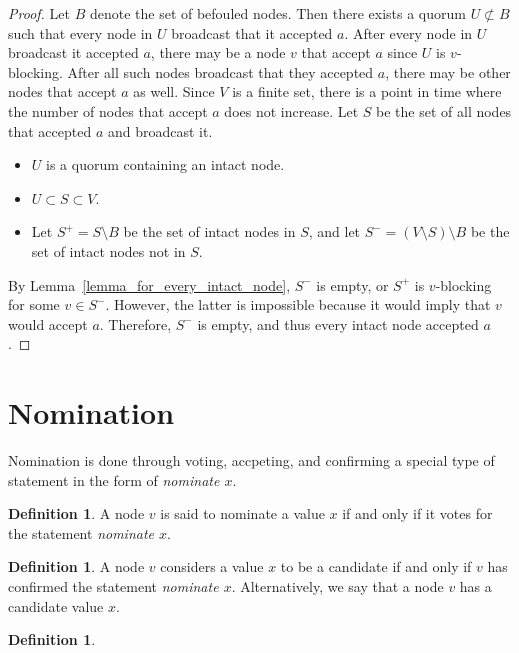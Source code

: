 \documentclass[12pt, psamsfonts]{amsart}
\theoremstyle{definition}
\newtheorem{defn}[thm]{Definition}
\theoremstyle{remark}
\numberwithin{equation}{section}
\begin{document}
\begin{proof}
    Let $B$ denote the set of befouled nodes.
    Then there exists a quorum $U \not\subset B$ such that every node in $U$ broadcast that it accepted $a$.
    After every node in $U$ broadcast it accepted $a$, there may be a node $v$ that accept $a$ since $U$ is $v$-blocking.
    After all such nodes broadcast that they accepted $a$, there may be other nodes that accept $a$ as well.
    Since $V$ is a finite set, there is a point in time where the number of nodes that accept $a$ does not increase.
    Let $S$ be the set of all nodes that accepted $a$ and broadcast it.
    \begin{itemize}
        \item
            $U$ is a quorum containing an intact node.
        \item
            $U \subset S \subset V$.
        \item
            Let $S^{+} = S \setminus B$ be the set of intact nodes in $S$, and let $S^{-} = (V \setminus S) \setminus B$ be the set of intact nodes not in $S$.
    \end{itemize}
    By Lemma~\ref{lemma_for_every_intact_node}, $S^{-}$ is empty, or $S^{+}$ is $v$-blocking for some $v \in S^{-}$.
    However, the latter is impossible because it would imply that $v$ would accept $a$.
    Therefore, $S^{-}$ is empty, and thus every intact node accepted $a$.
\end{proof}

\section{Nomination}

Nomination is done through voting, accpeting, and confirming a special type of statement in the form of \textit{nominate $x$}.

\begin{defn}
    A node $v$ is said to nominate a value $x$ if and only if it votes for the statement \textit{nominate $x$}.
\end{defn}

\begin{defn}
    A node $v$ considers a value $x$ to be a candidate if and only if $v$ has confirmed the statement \textit{nominate $x$}.
    Alternatively, we say that a node $v$ has a candidate value $x$.
\end{defn}

\begin{defn}
\end{defn}
\end{document}
